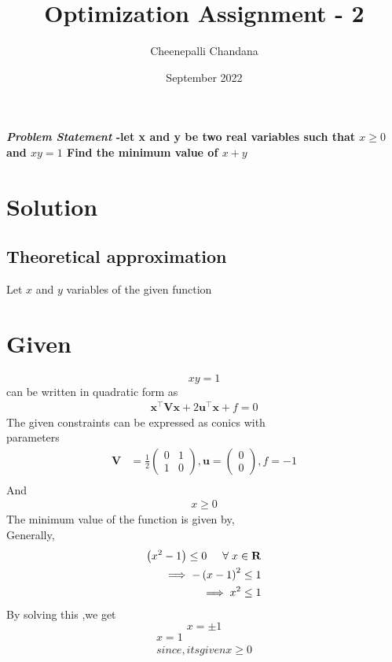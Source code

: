 \documentclass[journal,10pt,twocolumn]{article}
\title{\textbf{Optimization Assignment - 2}}
\author{Cheenepalli Chandana}
\date{September 2022}
\let\vec\mathbf
\newcommand{\myvec}[1]{\ensuremath{\begin{pmatrix}#1\end{pmatrix}}}
\providecommand{\brak}[1]{\ensuremath{\left(#1\right)}}
\begin{document}
\maketitle
\paragraph{\textit{Problem Statement} -let x and y be two real variables such that $x \geq 0$ and $xy=1$ Find the minimum value of $x+y$} 

\section*{\large Solution}
\subsection*{\normalsize Theoretical approximation}
Let $x$ and $y$ variables of the given function \\
\section*{\large Given}
\begin{equation}
xy=1
\end{equation}
can be written in quadratic form as
\begin{align}
	\vec{x}^{\top}\vec{V}\vec{x}+2\vec{u}^{\top}\vec{x}+f=0
\end{align}
The given constraints  can be expressed as conics with \\parameters
\begin{align}
	\vec{V} &= \frac{1}{2}\myvec{0&1\\1&0}, \vec{u} = \myvec{0 \\0}, f = -1\\
	\end{align}
And
\begin{align}
x\geq 0
\end{align}
The minimum value of the  function is given by,\\ \vspace{1mm}
Generally,
\begin{align*}
\brak{x^2-1}\leq 0 \hspace{5mm} \forall \hspace{1mm} x \in \mathbf{R} \\
\implies -\brak{x-1}^2 \le 1 \\
\implies x^2 \le 1 \\
\end{align*}
By solving this ,we get
\begin{equation}
x = \pm 1
\end{equation}
\begin{align}
	\boxed{x = 1}\\
	since, its given  x\geq 0\\
\end{align}
\end{document}
